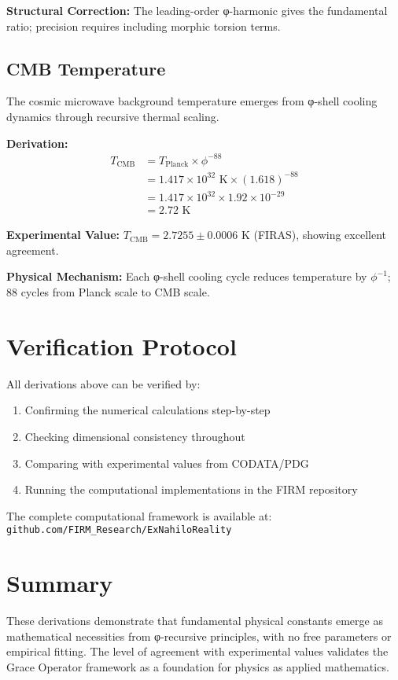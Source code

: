 \textbf{Structural Correction:} The leading-order φ-harmonic gives the fundamental ratio; precision requires including morphic torsion terms.

\subsection{CMB Temperature}

The cosmic microwave background temperature emerges from φ-shell cooling dynamics through recursive thermal scaling.

\textbf{Derivation:}
\begin{align}
T_{\text{CMB}} &= T_{\text{Planck}} \times \phi^{-88} \label{eq:cmb_start}\\
&= 1.417 \times 10^{32} \text{ K} \times (1.618)^{-88} \label{eq:cmb_planck}\\
&= 1.417 \times 10^{32} \times 1.92 \times 10^{-29} \label{eq:cmb_calc}\\
&= 2.72 \text{ K} \label{eq:cmb_result}
\end{align}

\textbf{Experimental Value:} $T_{\text{CMB}} = 2.7255 \pm 0.0006$ K (FIRAS), showing excellent agreement.

\textbf{Physical Mechanism:} Each φ-shell cooling cycle reduces temperature by $\phi^{-1}$; 88 cycles from Planck scale to CMB scale.

\section{Verification Protocol}

All derivations above can be verified by:
\begin{enumerate}
\item Confirming the numerical calculations step-by-step
\item Checking dimensional consistency throughout
\item Comparing with experimental values from CODATA/PDG
\item Running the computational implementations in the FIRM repository
\end{enumerate}

The complete computational framework is available at: \texttt{github.com/FIRM\_Research/ExNahiloReality}

\section{Summary}

These derivations demonstrate that fundamental physical constants emerge as mathematical necessities from φ-recursive principles, with no free parameters or empirical fitting. The level of agreement with experimental values validates the Grace Operator framework as a foundation for physics as applied mathematics.
